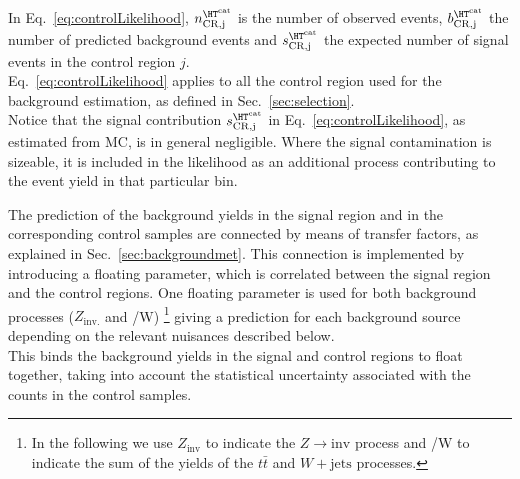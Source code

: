 In Eq.~\ref{eq:controlLikelihood}, $n^{\htcat}_{\mathrm{CR,j}}$ is the number of observed events, $b^{\htcat}_{\mathrm{CR,j}}$ the number of predicted 
background events and $s^{\htcat}_{\mathrm{CR,j}}$ the expected number of signal events in the control region $j$. \\
Eq.~\ref{eq:controlLikelihood} applies to all the control region used for the background estimation, 
as defined in Sec.~\ref{sec:selection}. \\
Notice that the signal contribution $s^{\htcat}_{\mathrm{CR,j}}$ in Eq.~\ref{eq:controlLikelihood}, as estimated from MC, is in general negligible. 
Where the signal contamination is sizeable, it is included in the likelihood as an additional process contributing to the event yield in that particular bin.

The prediction of the background yields in the signal region and in the corresponding control samples are connected 
by means of transfer factors, as explained in Sec.~\ref{sec:backgroundmet}. 
This connection is implemented by introducing a floating parameter, which is correlated 
between the signal region and the control regions. 
One floating parameter is used for both background 
processes ($Z_{\mathrm{inv.}}$ and \ttbar/W) \footnote{In the following we use $Z_{\mathrm{inv}}$ to indicate 
the $Z\to \mathrm{inv}$ process and \ttbar/W to indicate the sum of the yields of the $t\bar{t}$ and $W+\mathrm{jets}$ processes.}
giving a prediction for each background source depending on the relevant nuisances described below. \\
This binds the background yields in the signal and control regions to float together, 
taking into account the statistical uncertainty associated with the counts in the control samples. 

